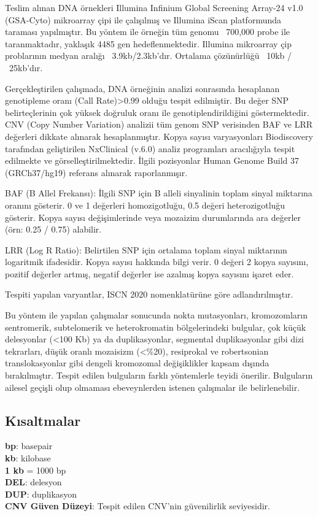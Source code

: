 \documentclass{article}
\begin{document}
Teslim alınan DNA örnekleri Illumina Infinium Global Screening Array-24 v1.0 (GSA-Cyto) mikroarray çipi ile çalışılmış ve Illumina iScan platformunda taraması yapılmıştır. Bu yöntem ile örneğin tüm genomu ~700,000 probe ile taranmaktadır, yaklaşık 4485 gen hedeflenmektedir. Illumina mikroarray çip problarının medyan aralığı ~3.9kb/2.3kb’dır. Ortalama çözünürlüğü ~10kb / ~25kb’dır.

Gerçekleştirilen çalışmada, DNA örneğinin analizi sonrasında hesaplanan genotipleme oranı (Call Rate)>0.99 olduğu tespit edilmiştir. Bu değer SNP belirteçlerinin çok yüksek doğruluk oranı ile genotiplendirildiğini göstermektedir. CNV (Copy Number Variation) analizii tüm genom SNP verisinden BAF ve LRR değerleri dikkate alınarak hesaplanmıştır. Kopya sayısı varyasyonları Biodiscovery tarafından geliştirilen NxClinical (v.6.0) analiz programları aracılığıyla tespit edilmekte ve görselleştirilmektedir. İlgili pozisyonlar Human Genome Build 37 (GRCh37/hg19) referans alınarak raporlanmışır.

BAF (B Allel Frekansı): İlgili SNP için B alleli sinyalinin toplam sinyal miktarına oranını gösterir. 0 ve 1 değerleri homozigotluğu, 0.5 değeri heterozigotluğu gösterir. Kopya sayısı değişimlerinde veya mozaizim durumlarında ara değerler (örn: 0.25 / 0.75) alabilir. 

LRR (Log R Ratio): Belirtilen SNP için ortalama toplam sinyal miktarının logaritmik ifadesidir. Kopya sayısı hakkında bilgi verir. 0 değeri 2 kopya sayısını, pozitif değerler artmış, negatif  değerler  ise  azalmış  kopya sayısını işaret eder.

Tespiti yapılan varyantlar, ISCN 2020 nomenklatürüne göre adlandırılmıştır.

Bu yöntem ile yapılan çalışmalar sonucunda nokta mutasyonları, kromozomların sentromerik, subtelomerik ve heterokromatin bölgelerindeki bulgular, çok küçük delesyonlar (<100 Kb) ya da duplikasyonlar, segmental duplikasyonlar gibi dizi tekrarları, düşük oranlı mozaisizm (<\%20), resiprokal ve robertsonian translokasyonlar gibi dengeli kromozomal değişiklikler kapsam dışında bırakılmıştır. Tespit edilen bulguların farklı yöntemlerle teyidi önerilir. Bulguların ailesel geçişli olup olmaması ebeveynlerden istenen çalışmalar ile belirlenebilir.

\subsection*{Kısaltmalar}

\textbf{bp}: basepair \\
\textbf{kb}: kilobase \\
\textbf{1 kb} = 1000 bp \\
\textbf{DEL}: delesyon \\
\textbf{DUP}: duplikasyon \\
\textbf{CNV Güven Düzeyi}: Tespit edilen CNV'nin güvenilirlik seviyesidir.
\end{document}
